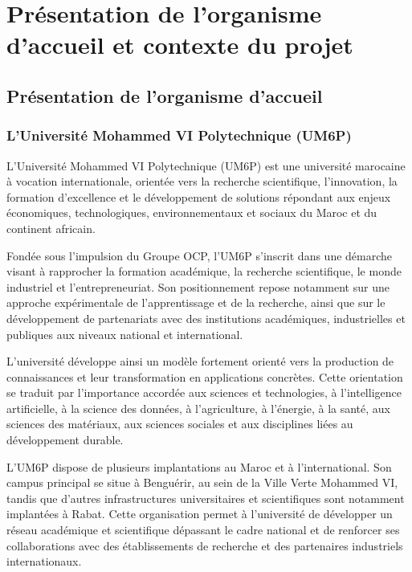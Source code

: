 \documentclass[12pt,a4paper]{report}
\begin{document}
\chapter{Présentation de l'organisme d'accueil et contexte du projet}

\section{Présentation de l'organisme d'accueil}

\subsection{L'Université Mohammed VI Polytechnique (UM6P)}

L'Université Mohammed VI Polytechnique (UM6P) est une université marocaine à vocation internationale, orientée vers la recherche scientifique, l'innovation, la formation d'excellence et le développement de solutions répondant aux enjeux économiques, technologiques, environnementaux et sociaux du Maroc et du continent africain.

Fondée sous l'impulsion du Groupe OCP, l'UM6P s'inscrit dans une démarche visant à rapprocher la formation académique, la recherche scientifique, le monde industriel et l'entrepreneuriat. Son positionnement repose notamment sur une approche expérimentale de l'apprentissage et de la recherche, ainsi que sur le développement de partenariats avec des institutions académiques, industrielles et publiques aux niveaux national et international.

L'université développe ainsi un modèle fortement orienté vers la production de connaissances et leur transformation en applications concrètes. Cette orientation se traduit par l'importance accordée aux sciences et technologies, à l'intelligence artificielle, à la science des données, à l'agriculture, à l'énergie, à la santé, aux sciences des matériaux, aux sciences sociales et aux disciplines liées au développement durable.

L'UM6P dispose de plusieurs implantations au Maroc et à l'international. Son campus principal se situe à Benguérir, au sein de la Ville Verte Mohammed VI, tandis que d'autres infrastructures universitaires et scientifiques sont notamment implantées à Rabat. Cette organisation permet à l'université de développer un réseau académique et scientifique dépassant le cadre national et de renforcer ses collaborations avec des établissements de recherche et des partenaires industriels internationaux.
\end{document}
